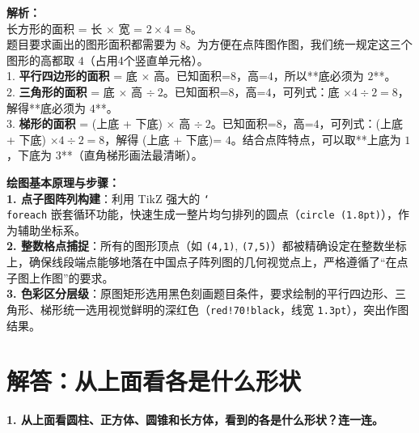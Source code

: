 \vspace{0.8cm}

{\small\color{gray}
\textbf{解析：}\\
长方形的面积 = 长 $\times$ 宽 = $2 \times 4 = 8$。\\
题目要求画出的图形面积都需要为 $8$。为方便在点阵图作图，我们统一规定这三个图形的高都取 $4$（占用4个竖直单元格）。\\
1. \textbf{平行四边形的面积} = 底 $\times$ 高。已知面积=$8$，高=$4$，所以**底必须为 $2$**。\\
2. \textbf{三角形的面积} = 底 $\times$ 高 $\div\ 2$。已知面积=$8$，高=$4$，可列式：底 $\times 4 \div 2 = 8$，解得**底必须为 $4$**。\\
3. \textbf{梯形的面积} = (上底 + 下底) $\times$ 高 $\div\ 2$。已知面积=$8$，高=$4$，可列式：(上底 + 下底) $\times 4 \div 2 = 8$，解得 (上底 + 下底)= $4$。结合点阵特点，可以取**上底为 $1$，下底为 $3$**（直角梯形画法最清晰）。
}

\vspace{0.6cm}

{\small\color{blue!70!black}
\textbf{绘图基本原理与步骤：}\\
\textbf{1. 点子图阵列构建}：利用 TikZ 强大的 \texttt{\char`\\foreach} 嵌套循环功能，快速生成一整片均匀排列的圆点（\texttt{circle (1.8pt)}），作为辅助坐标系。\\
\textbf{2. 整数格点捕捉}：所有的图形顶点（如 \texttt{(4,1)}, \texttt{(7,5)}）都被精确设定在整数坐标上，确保线段端点能够地落在中国点子阵列图的几何视觉点上，严格遵循了“在点子图上作图”的要求。\\
\textbf{3. 色彩区分层级}：原图矩形选用黑色刻画题目条件，要求绘制的平行四边形、三角形、梯形统一选用视觉鲜明的深红色（\texttt{red!70!black}，线宽 \texttt{1.3pt}），突出作图结果。
}

\newpage


\section{解答：从上面看各是什么形状}

\vspace{0.4cm}

\noindent\textbf{1. 从上面看圆柱、正方体、圆锥和长方体，看到的各是什么形状？连一连。}

\vspace{1.2cm}

